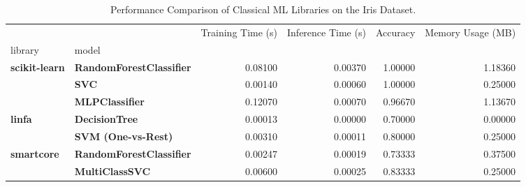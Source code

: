 \begin{table}
\caption{Performance Comparison of Classical ML Libraries on the Iris Dataset.}
\label{tab:classical_ml_results}
\begin{tabular}{llrrrr}
\toprule
 &  & Training Time (s) & Inference Time (s) & Accuracy & Memory Usage (MB) \\
library & model &  &  &  &  \\
\midrule
\multirow[t]{3}{*}{\textbf{scikit-learn}} & \textbf{RandomForestClassifier} & 0.08100 & 0.00370 & 1.00000 & 1.18360 \\
\textbf{} & \textbf{SVC} & 0.00140 & 0.00060 & 1.00000 & 0.25000 \\
\textbf{} & \textbf{MLPClassifier} & 0.12070 & 0.00070 & 0.96670 & 1.13670 \\
\cline{1-6}
\multirow[t]{2}{*}{\textbf{linfa}} & \textbf{DecisionTree} & 0.00013 & 0.00000 & 0.70000 & 0.00000 \\
\textbf{} & \textbf{SVM (One-vs-Rest)} & 0.00310 & 0.00011 & 0.80000 & 0.25000 \\
\cline{1-6}
\multirow[t]{2}{*}{\textbf{smartcore}} & \textbf{RandomForestClassifier} & 0.00247 & 0.00019 & 0.73333 & 0.37500 \\
\textbf{} & \textbf{MultiClassSVC} & 0.00600 & 0.00025 & 0.83333 & 0.25000 \\
\cline{1-6}
\bottomrule
\end{tabular}
\end{table}
